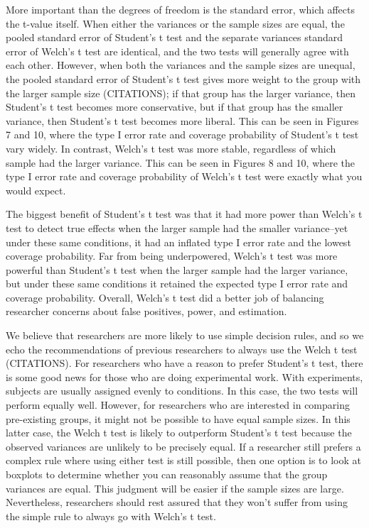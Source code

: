 \documentclass[man,a4paper,noextraspace,apacite]{apa6}\usepackage[]{graphicx}\usepackage[]{color}
\begin{document}
    More important than the degrees of freedom is the standard error, which affects the t-value itself. When either the variances or the sample sizes are equal, the pooled standard error of Student's t test and the separate variances standard error of Welch's t test are identical, and the two tests will generally agree with each other. However, when both the variances and the sample sizes are unequal, the pooled standard error of Student's t test gives more weight to the group with the larger sample size (CITATIONS); if that group has the larger variance, then Student's t test becomes more conservative, but if that group has the smaller variance, then Student's t test becomes more liberal. This can be seen in Figures 7 and 10, where the type I error rate and coverage probability of Student's t test vary widely. In contrast, Welch's t test was more stable, regardless of which sample had the larger variance. This can be seen in Figures 8 and 10, where the type I error rate and coverage probability of Welch's t test were exactly what you would expect.
    
    The biggest benefit of Student's t test was that it had more power than Welch's t test to detect true effects when the larger sample had the smaller variance--yet under these same conditions, it had an inflated type I error rate and the lowest coverage probability. Far from being underpowered, Welch's t test was more powerful than Student's t test when the larger sample had the larger variance, but under these same conditions it retained the expected type I error rate and coverage probability. Overall, Welch's t test did a better job of balancing researcher concerns about false positives, power, and estimation.
    
    We believe that researchers are more likely to use simple decision rules, and so we echo the recommendations of previous researchers to always use the Welch t test (CITATIONS). For researchers who have a reason to prefer Student's t test, there is some good news for those who are doing experimental work. With experiments, subjects are usually assigned evenly to conditions. In this case, the two tests will perform equally well. However, for researchers who are interested in comparing pre-existing groups, it might not be possible to have equal sample sizes. In this latter case, the Welch t test is likely to outperform Student's t test because the observed variances are unlikely to be precisely equal. If a researcher still prefers a complex rule where using either test is still possible, then one option is to look at boxplots to determine whether you can reasonably assume that the group variances are equal. This judgment will be easier if the sample sizes are large. Nevertheless, researchers should rest assured that they won't suffer from using the simple rule to always go with Welch's t test.
    
\end{document}
